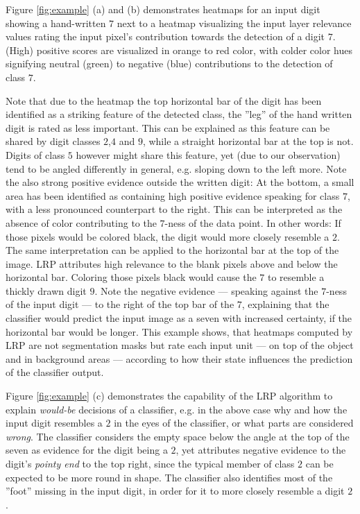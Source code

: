 \documentclass[a4wide]{article}
\begin{document}
Figure \ref{fig:example} (a) and (b) demonstrates heatmaps for an input digit showing a hand-written $7$ next to a heatmap visualizing the input layer relevance values rating the input pixel's contribution towards the detection of a digit $7$. (High) positive scores are visualized in orange to red color, with colder color hues signifying neutral (green) to negative (blue) contributions to the detection of class $7$.

Note that due to the heatmap the top horizontal bar of the digit has been identified as a striking feature of the detected class, the ''leg'' of the hand written digit is rated as less important. This can be explained as this feature can be shared by digit classes $2$,$4$ and $9$, while a straight horizontal bar at the top is not. Digits of class $5$ however might share this feature, yet (due to our observation) tend to be angled differently in general, e.g. sloping down to the left more. Note the also strong positive evidence outside the written digit: At the bottom, a small area has been identified as containing high positive evidence speaking for class $7$, with a less pronounced counterpart to the right. This can be interpreted as the absence of color contributing to the $7$-ness of the data point. In other words: If those pixels would be colored black, the digit would more closely resemble a $2$. The same interpretation can be applied to the horizontal bar at the top of the image. LRP attributes high relevance to the blank pixels above and below the horizontal bar. Coloring those pixels black would cause the $7$ to resemble a thickly drawn digit $9$. Note the negative evidence --- speaking against the $7$-ness of the input digit --- to the right of the top bar of the $7$, explaining that the classifier would predict the input image as a seven with increased certainty, if the horizontal bar would be longer. This example shows, that heatmaps computed by LRP are not segmentation masks but rate each input unit --- on top of the object and in background areas --- according to how their state influences the prediction of the classifier output.

Figure \ref{fig:example} (c) demonstrates the capability of the LRP algorithm to explain \emph{would-be} decisions of a classifier, e.g. in the above case why and how the input digit resembles a $2$ in the eyes of the classifier, or what parts are considered \emph{wrong}. The classifier considers the empty space below the angle at the top of the seven as evidence for the digit being a $2$, yet attributes negative evidence to the digit's \emph{pointy end} to the top right, since the typical member of class $2$ can be expected to be more round in shape. The classifier also identifies most of the ''foot'' missing in the input digit, in order for it to more closely resemble a digit $2$.
\end{document}
